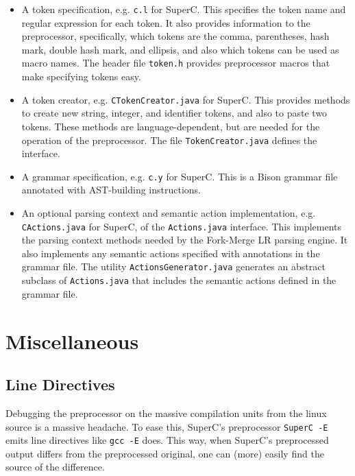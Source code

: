 \documentclass{report}
\newcommand{\SuperC}{{\textsf{Su\-perC}}}
\begin{document}
\begin{itemize}
\item A token specification, e.g. \verb"c.l" for \SuperC{}.  This
  specifies the token name and regular expression for each token.  It
  also provides information to the preprocessor, specifically, which
  tokens are the comma, parentheses, hash mark, double hash mark, and
  ellipsis, and also which tokens can be used as macro names.  The
  header file \verb"token.h" provides preprocessor macros that make
  specifying tokens easy.
\item A token creator, e.g. \verb"CTokenCreator.java" for \SuperC{}.
  This provides methods to create new string, integer, and identifier
  tokens, and also to paste two tokens.  These methods are
  language-dependent, but are needed for the operation of the
  preprocessor.  The file \verb"TokenCreator.java" defines the
  interface.
\item A grammar specification, e.g. \verb"c.y" for \SuperC{}.  This is
  a Bison grammar file annotated with AST-building instructions.
\item An optional parsing context and semantic action implementation,
  e.g. \verb"CActions.java" for \SuperC{}, of the \verb"Actions.java"
  interface.  This implements the parsing context methods needed by
  the Fork-Merge LR parsing engine.  It also implements any semantic
  actions specified with annotations in the grammar file.  The utility
  \verb"ActionsGenerator.java" generates an abstract subclass of
  \verb"Actions.java" that includes the semantic actions defined in
  the grammar file.
\end{itemize}




\chapter{Miscellaneous}


\section{Line Directives}

Debugging the preprocessor on the massive compilation units from the
linux source is a massive headache.  To ease this, SuperC's
preprocessor \verb"SuperC -E" emits line directives like \verb"gcc -E" does.
This way, when SuperC's preprocessed output differs from the
preprocessed original, one can (more) easily find the source of the
difference.
\end{document}
